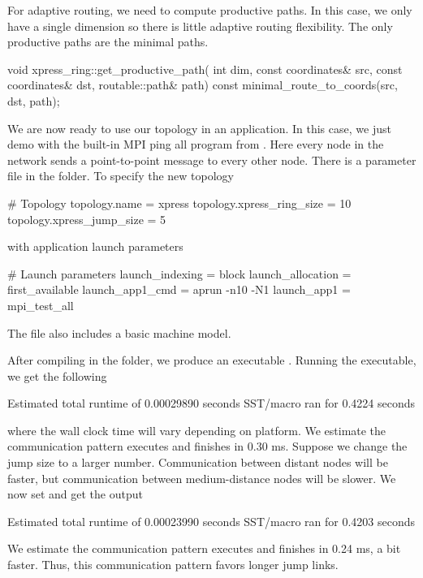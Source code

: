 For adaptive routing, we need to compute productive paths.
In this case, we only have a single dimension so there is little adaptive routing flexibility.
The only productive paths are the minimal paths.

\begin{CppCode}
void
xpress_ring::get_productive_path(
  int dim,
  const coordinates& src,
  const coordinates& dst,
  routable::path& path) const
{
  minimal_route_to_coords(src, dst, path);
}
\end{CppCode}

We are now ready to use our topology in an application.
In this case, we just demo with the built-in MPI ping all program from \sstmacro.
Here every node in the network sends a point-to-point message to every other node.
There is a parameter file in the  folder.
To specify the new topology

\begin{ViFile}
# Topology
topology.name = xpress
topology.xpress_ring_size = 10
topology.xpress_jump_size = 5
\end{ViFile}
with application launch parameters

\begin{ViFile}
# Launch parameters
launch_indexing = block
launch_allocation = first_available
launch_app1_cmd = aprun -n10 -N1
launch_app1 = mpi_test_all
\end{ViFile}
The file also includes a basic machine model.

After compiling in the folder, we produce an executable .
Running the executable, we get the following

\begin{ShellCmd}
Estimated total runtime of           0.00029890 seconds
SST/macro ran for       0.4224 seconds
\end{ShellCmd}
where the \sstmacro wall clock time will vary depending on platform.
We estimate the communication pattern executes and finishes in 0.30 ms.
Suppose we change the jump size to a larger number.
Communication between distant nodes will be faster, but communication between medium-distance nodes will be slower.
We now set  and get the output

\begin{ShellCmd}
Estimated total runtime of           0.00023990 seconds
SST/macro ran for       0.4203 seconds
\end{ShellCmd}
We estimate the communication pattern executes and finishes in 0.24 ms, a bit faster.
Thus, this communication pattern favors longer jump links.


